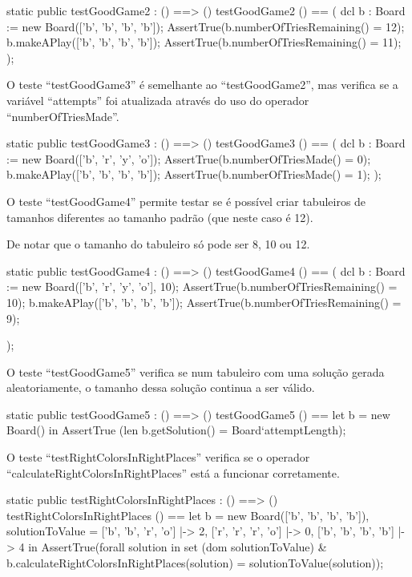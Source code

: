 \begin{vdm_al}
    static public testGoodGame2 : () ==> ()
    testGoodGame2 () ==
    ( dcl b : Board := new Board(['b', 'b', 'b', 'b']);
      AssertTrue(b.numberOfTriesRemaining() = 12);
      b.makeAPlay(['b', 'b', 'b', 'b']);
      AssertTrue(b.numberOfTriesRemaining() = 11);
    );
\end{vdm_al}  
  
O teste ``testGoodGame3'' é semelhante ao ``testGoodGame2'', mas
verifica se a variável ``attempts'' foi atualizada através do uso do
operador ``numberOfTriesMade''.
  
\begin{vdm_al}
    static public testGoodGame3 : () ==> ()
    testGoodGame3 () ==
    ( dcl b : Board := new Board(['b', 'r', 'y', 'o']);
      AssertTrue(b.numberOfTriesMade() = 0);
      b.makeAPlay(['b', 'b', 'b', 'b']);
      AssertTrue(b.numberOfTriesMade() = 1);
    );
\end{vdm_al}
  
O teste ``testGoodGame4'' permite testar se é possível criar
tabuleiros de tamanhos diferentes ao tamanho padrão (que neste caso é
12).

De notar que o tamanho do tabuleiro só pode ser 8, 10 ou 12.

\begin{vdm_al}
    static public testGoodGame4 : () ==> ()
    testGoodGame4 () ==
    ( dcl b : Board := new Board(['b', 'r', 'y', 'o'], 10);
      AssertTrue(b.numberOfTriesRemaining() = 10);
      b.makeAPlay(['b', 'b', 'b', 'b']);
      AssertTrue(b.numberOfTriesRemaining() = 9);
  
    );
\end{vdm_al}
  
O teste ``testGoodGame5'' verifica se num tabuleiro com uma solução
gerada aleatoriamente, o tamanho dessa solução continua a ser válido.

\begin{vdm_al}
    static public testGoodGame5 : () ==> ()
    testGoodGame5 () ==
      let b = new Board()
        in
        AssertTrue (len b.getSolution() = Board`attemptLength);
\end{vdm_al}

O teste ``testRightColorsInRightPlaces'' verifica se o operador
``calculateRightColorsInRightPlaces'' está a funcionar corretamente.
  
\begin{vdm_al}  
    static public testRightColorsInRightPlaces : () ==> ()
    testRightColorsInRightPlaces () ==
      let b = new Board(['b', 'b', 'b', 'b']),
        solutionToValue = {
          ['b', 'b', 'r', 'o'] |-> 2,
          ['r', 'r', 'r', 'o'] |-> 0,
          ['b', 'b', 'b', 'b'] |-> 4
        } in
        AssertTrue(forall solution in set (dom solutionToValue)
          & b.calculateRightColorsInRightPlaces(solution) = solutionToValue(solution));
\end{vdm_al}  
  
